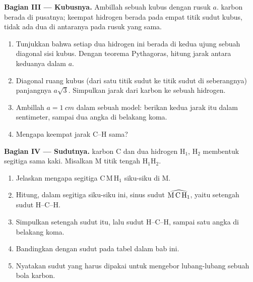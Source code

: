 \begin{problem}
\medskip
\noindent\textbf{Bagian III --- Kubusnya.}
Ambillah sebuah kubus dengan rusuk $a$.  karbon berada di pusatnya;
keempat  hidrogen berada pada empat titik sudut kubus, tidak ada dua
di antaranya pada rusuk yang sama.
\begin{enumerate}[resume]
  \item Tunjukkan bahwa setiap dua  hidrogen ini berada di kedua ujung
        sebuah diagonal sisi kubus. Dengan teorema Pythagoras, hitung jarak
        antara keduanya dalam $a$.
  \item Diagonal ruang kubus (dari satu titik sudut ke titik sudut di
        seberangnya) panjangnya $a\sqrt{3}$. Simpulkan jarak dari 
        karbon ke sebuah  hidrogen.
  \item Ambillah $a = \qty{1}{cm}$ dalam sebuah model: berikan kedua
        jarak itu dalam sentimeter, sampai dua angka di belakang koma.
  \item Mengapa keempat jarak C--H sama?
\end{enumerate}

\medskip
\noindent\textbf{Bagian IV --- Sudutnya.}
 karbon C dan dua  hidrogen H$_1$, H$_2$ membentuk segitiga sama
kaki. Misalkan M titik tengah H$_1$H$_2$.
\begin{enumerate}[resume]
  \item Jelaskan mengapa segitiga C\,M\,H$_1$ siku-siku di M.
  \item Hitung, dalam segitiga siku-siku ini, sinus sudut
        $\widehat{\text{M\,C\,H}_1}$, yaitu setengah sudut H--C--H.
  \item Simpulkan setengah sudut itu, lalu sudut H--C--H, sampai satu
        angka di belakang koma.
  \item Bandingkan dengan sudut pada tabel dalam bab ini.
  \item Nyatakan sudut yang harus dipakai untuk mengebor lubang-lubang
        sebuah bola karbon.
\end{enumerate}
\end{problem}
